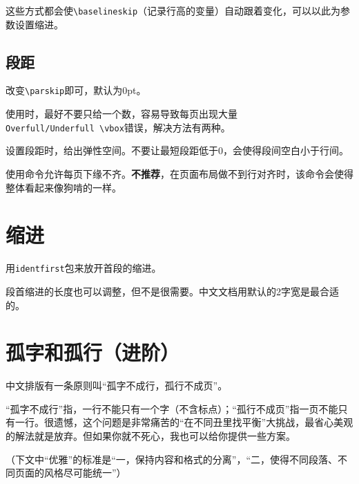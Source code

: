 \documentclass[10pt,openany]{book}
\begin{document}
这些方式都会使\texttt{\textbackslash{}baselineskip}（记录行高的变量）自动跟着变化，可以以此为参数设置缩进。

\subsection{段距}

改变\texttt{\textbackslash{}parskip}即可，默认为0pt。



使用时，最好不要只给一个数，容易导致每页出现大量\texttt{Overfull/Underfull\ \textbackslash{}vbox}错误，解决方法有两种。

\begin{tightenum}
    \item   设置段距时，给出弹性空间。不要让最短段距低于0，会使得段间空白小于行间。
    \item   使用命令允许每页下缘不齐。\textbf{不推荐}，在页面布局做不到行对齐时，该命令会使得整体看起来像狗啃的一样。
\end{tightenum}



\section{缩进}

用\texttt{identfirst}包来放开首段的缩进。



段首缩进的长度也可以调整，但不是很需要。中文文档用默认的2字宽是最合适的。



\section{孤字和孤行（进阶）}

中文排版有一条原则叫“孤字不成行，孤行不成页”。

“孤字不成行”指，一行不能只有一个字（不含标点）；“孤行不成页”指一页不能只有一行。很遗憾，这个问题是非常痛苦的“在不同丑里找平衡”大挑战，最省心美观的解法就是放弃。但如果你就不死心，我也可以给你提供一些方案。

（下文中“优雅”的标准是“一，保持内容和格式的分离”，“二，使得不同段落、不同页面的风格尽可能统一”）
\end{document}
